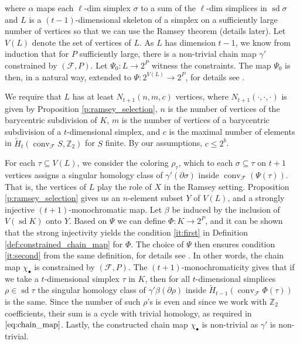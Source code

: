 \documentclass[a4paper,12pt]{amsart}
\newcommand{\Z}{\mathbb{Z}} 	%
\newcommand{\F}{\mathcal{F}} 	%
\DeclareMathOperator\sd{sd}
\DeclareMathOperator{\conv}{conv}
\theoremstyle{definition}
\begin{document}
where $\alpha$ maps each $\ell$-dim simplex $\sigma$ to a sum of the $\ell$-dim simplices in $\sd \sigma$ and $L$ is a $(t-1)$-dimensional skeleton of a simplex on a sufficiently large number of vertices so that we can use the Ramsey theorem (details later). Let $V(L)$ denote the set of vertices of $L$. As $L$ has dimension $t-1$, we know from induction that for $P$ sufficiently large, there is a non-trivial chain map $\gamma'$ constrained by $(\F, P)$. Let $\Psi_0 \colon L \to 2^P$ witness the constraints. The map $\Psi_0$ is then, in a natural way, extended to $\Psi \colon 2^{V(L)} \to 2^P$, for details see \cite{bettiRadon}. 

We require that $L$ has at least $N_{t+1}(n,m,c)$ vertices, where $N_{t+1}(\cdot,\cdot,\cdot)$ is given by Proposition \ref{p:ramsey_selection}, $n$ is the number of vertices of the barycentric subdivision of $K$, $m$ is the number of vertices of a barycentric subdivision of a $t$-dimensional simplex, and $c$ is the maximal number of elements in $\widetilde H_t(\conv_\F S, \Z_2)$ for $S$ finite. By our assumptions, $c \leq 2^b$.

For each $\tau \subseteq V(L)$, we consider the coloring $\rho_\tau$, which to each $\sigma \subseteq \tau$ on $t+1$ vertices assigns a singular homology class of $\gamma'(\partial \sigma)$ inside $\conv_\F(\Psi(\tau))$. That is, the vertices of $L$ play the role of $X$ in the Ramsey setting. Proposition \ref{p:ramsey_selection}
 gives us an $n$-element subset $Y$ of $V(L)$, and a strongly injective $(t+1)$-monochromatic map.
 Let $\beta$ be induced by the inclusion of $V(\sd K)$ onto $Y$.
Based on $\Psi$ we can define $\Phi: K \to 2^P$, and it can be shown that the strong injectivity yields the condition \eqref{it:first} in Definition \ref{def:constrained_chain_map} for $\Phi$. The choice of $\Psi$ then ensures condition \eqref{it:second} from the same definition, for details see \cite{bettiRadon}.
In other words, the chain map $\chi_\bullet$ is constrained by $(\mathcal F, P)$.
The $(t+1)$-monochromaticity gives that if we take a $t$-dimensional simplex $\tau$ in $K$, then for all $t$-dimensional simplices $\rho\in\sd\tau$  the singular homology class of $\gamma'\beta(\partial \rho)$ inside $\widetilde H_{t-1}(\conv_\F \Phi(\tau))$ is the same. Since the number of such $\rho$'s is even and since we work with $\Z_2$ coefficients, their sum is a cycle with trivial homology, as required in $\eqref{eq:chain_map}$. 
Lastly, the constructed chain map $\chi_\bullet$ is non-trivial as $\gamma'$ is non-trivial. 
\end{document}

